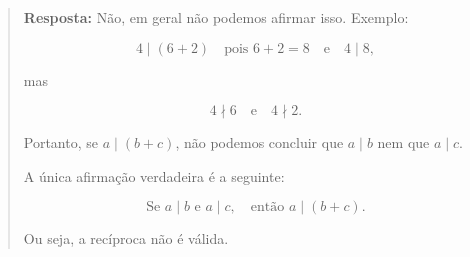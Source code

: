 \documentclass[12pt,a4paper]{article}
\newcommand{\answer}[1]{\begin{quote}#1\end{quote}}
\begin{document}
    \answer{\textbf{Resposta:} Não, em geral não podemos afirmar isso.  
        Exemplo: 
        
        \[
        4 \mid (6 + 2) \quad \text{pois } 6+2 = 8 \quad \text{e} \quad 4 \mid 8,
        \]
        
        mas 
        
        \[
        4 \nmid 6 \quad \text{e} \quad 4 \nmid 2.
        \]
        
        Portanto, se \(a \mid (b+c)\), não podemos concluir que \(a \mid b\) nem que \(a \mid c\).  
        
        A única afirmação verdadeira é a seguinte:  
        
        \[
        \text{Se } a \mid b \text{ e } a \mid c, \quad \text{então } a \mid (b+c).
        \]
        
        Ou seja, a recíproca não é válida.
    }
\end{document}
